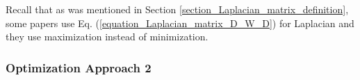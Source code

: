 \documentclass[lang=cn,10pt]{gorgeousnbook}
\numberwithin{equation}{section}%
\numberwithin{figure}{section}%
\begin{document}
Recall that as was mentioned in Section \ref{section_Laplacian_matrix_definition}, some papers use Eq. (\ref{equation_Laplacian_matrix_D_W_D}) for Laplacian and they use maximization instead of minimization. 





\subsubsection{Optimization Approach 2}
\end{document}
